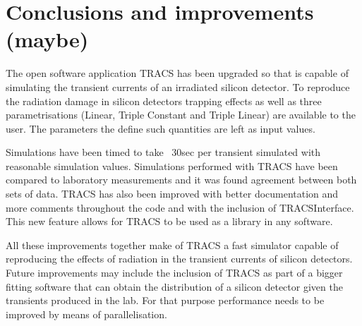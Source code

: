 \chapter{Conclusions and improvements (maybe)}

The open software application TRACS has been upgraded so that is capable of simulating the transient currents of an irradiated silicon detector. To reproduce the radiation damage in silicon detectors trapping effects as well as three \neff parametrisations (Linear, Triple Constant and Triple Linear) are available to the user. The parameters the define such quantities are left as input values.

Simulations have been timed to take ~30sec per transient simulated with reasonable simulation values. Simulations performed with TRACS have been compared to laboratory measurements and it was found agreement between both sets of data. TRACS has also been improved with better documentation and more comments throughout the code and with the inclusion of TRACSInterface. This new feature allows for TRACS to be used as a library in any software.

All these improvements together make of TRACS a fast simulator capable of reproducing the effects of radiation in the transient currents of silicon detectors. Future improvements may include the inclusion of TRACS as part of a bigger fitting software that can obtain the \neff distribution of a silicon detector given the transients produced in the lab. For that purpose performance needs to be improved by means of parallelisation.


